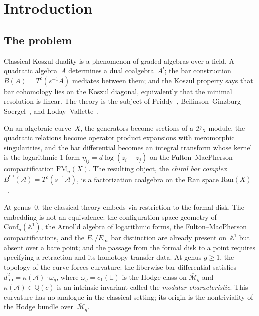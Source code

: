 \documentclass[11pt,reqno]{amsart}
\theoremstyle{definition}
\theoremstyle{remark}
\newcommand{\cA}{\mathcal{A}}
\newcommand{\barB}{\bar{B}}
\newcommand{\Ran}{\mathrm{Ran}}
\newcommand{\Mbar}{\overline{\mathcal{M}}}
\newcommand{\FM}{\mathrm{FM}}
\numberwithin{equation}{section}
\begin{document}
\maketitle

\tableofcontents


\section{Introduction}\label{sec:intro}

\subsection{The problem}\label{subsec:intro-problem}

Classical Koszul duality is a phenomenon of graded algebras
over a field. A quadratic algebra~$A$ determines a dual
coalgebra~$A^!$; the bar construction $B(A) = T^c(s^{-1}\bar{A})$
mediates between them; and the Koszul property says that bar
cohomology lies on the Koszul diagonal, equivalently that the
minimal resolution is linear. The theory is the
subject of Priddy~\cite{Priddy70},
Beilinson--Ginzburg--Soergel~\cite{BGS96}, and
Loday--Vallette~\cite{LV12}.

On an algebraic curve~$X$, the generators become
sections of a $\mathcal{D}_X$-module, the quadratic
relations become operator product expansions with
meromorphic singularities, and the bar differential
becomes an integral transform whose kernel is the
logarithmic $1$-form
$\eta_{ij} = d\log(z_i - z_j)$ on the Fulton--MacPherson
compactification $\FM_n(X)$. The resulting object, the
\emph{chiral bar complex}
$\barB^{\mathrm{ch}}(\cA) = T^c(s^{-1}\bar{\cA})$,
is a factorization coalgebra on the Ran space
$\Ran(X)$~\cite{BD04, FG12, CG17}.

At genus~$0$, the classical theory embeds via
restriction to the formal disk. The embedding is not
an equivalence: the configuration-space geometry of
$\mathrm{Conf}_n(\mathbb{A}^1)$, the Arnol'd algebra of
logarithmic forms, the Fulton--MacPherson
compactifications, and the $E_1/E_\infty$ bar
distinction are already present on~$\mathbb{A}^1$
but absent over a bare point; and the passage from the
formal disk to a point requires specifying a retraction
and its homotopy transfer data. At genus $g \ge 1$,
the topology of the curve forces
curvature: the fiberwise bar differential satisfies
$d_{\mathrm{fib}}^2 = \kappa(\cA) \cdot \omega_g$, where
$\omega_g = c_1(\mathbb{E})$ is the Hodge class on
$\Mbar_g$ and $\kappa(\cA) \in \mathbb{Q}(c)$ is an
intrinsic invariant called the \emph{modular
characteristic}. This curvature has no analogue in the
classical setting; its origin is the nontriviality of the
Hodge bundle over~$\Mbar_g$.
\end{document}
